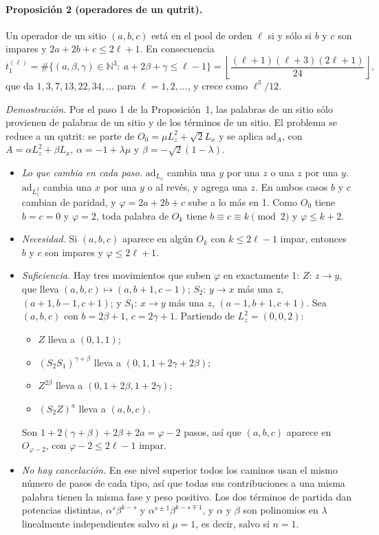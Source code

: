 \documentclass[11pt,a4paper]{article}
\begin{document}
\paragraph{Proposición 2 (operadores de un qutrit).} Un operador de un sitio $(a,b,c)$ está en el pool
de orden $\ell$ si y sólo si $b$ y $c$ son impares y $2a+2b+c\leq2\ell+1$. En consecuencia
\begin{equation}
  t^{(\ell)}_1=\#\{(a,\beta,\gamma)\in\mathbb N^3:\ a+2\beta+\gamma\leq\ell-1\}
  =\left\lfloor\frac{(\ell+1)(\ell+3)(2\ell+1)}{24}\right\rfloor ,
  \label{eq:t1}
\end{equation}
que da $1,3,7,13,22,34,\dots$ para $\ell=1,2,\dots$, y crece como $\ell^3/12$.

\emph{Demostración.} Por el paso 1 de la Proposición~1, las palabras de un sitio sólo provienen de
palabras de un sitio y de los términos de un sitio. El problema se reduce a un qutrit: se parte de
$O_0=\mu L_z^2+\sqrt2L_x$ y se aplica $\mathrm{ad}_A$, con $A=\alpha L_z^2+\beta L_x$,
$\alpha=-1+\lambda\mu$ y $\beta=-\sqrt2(1-\lambda)$.
\begin{itemize}
\item \emph{Lo que cambia en cada paso.} $\mathrm{ad}_{L_x}$ cambia una $y$ por una $z$ o una $z$ por una
  $y$. $\mathrm{ad}_{L_z^2}$ cambia una $x$ por una $y$ o al revés, y agrega una $z$. En ambos casos $b$
  y $c$ cambian de paridad, y $\varphi=2a+2b+c$ sube a lo más en 1. Como $O_0$ tiene $b=c=0$ y
  $\varphi=2$, toda palabra de $O_k$ tiene $b\equiv c\equiv k\pmod2$ y $\varphi\leq k+2$.
\item \emph{Necesidad.} Si $(a,b,c)$ aparece en algún $O_k$ con $k\leq2\ell-1$ impar, entonces $b$ y $c$
  son impares y $\varphi\leq2\ell+1$.
\item \emph{Suficiencia.} Hay tres movimientos que suben $\varphi$ en exactamente 1:
  $Z$: $z\to y$, que lleva $(a,b,c)\mapsto(a,b+1,c-1)$; $S_2$: $y\to x$ más una $z$,
  $(a+1,b-1,c+1)$; y $S_1$: $x\to y$ más una $z$, $(a-1,b+1,c+1)$. Sea $(a,b,c)$ con $b=2\beta+1$,
  $c=2\gamma+1$. Partiendo de $L_z^2=(0,0,2)$:
  \begin{itemize}
  \item $Z$ lleva a $(0,1,1)$;
  \item $(S_2S_1)^{\gamma+\beta}$ lleva a $(0,1,1+2\gamma+2\beta)$;
  \item $Z^{2\beta}$ lleva a $(0,1+2\beta,1+2\gamma)$;
  \item $(S_2Z)^{a}$ lleva a $(a,b,c)$.
  \end{itemize}
  Son $1+2(\gamma+\beta)+2\beta+2a=\varphi-2$ pasos, así que $(a,b,c)$ aparece en $O_{\varphi-2}$, con
  $\varphi-2\leq2\ell-1$ impar.
\item \emph{No hay cancelación.} En ese nivel superior todos los caminos usan el mismo número de
  pasos de cada tipo, así que todas sus contribuciones a una misma palabra tienen la misma fase y
  peso positivo. Los dos términos de partida dan potencias distintas, $\alpha^s\beta^{k-s}$ y
  $\alpha^{s\pm1}\beta^{k-s\mp1}$, y $\alpha$ y $\beta$ son polinomios en $\lambda$ linealmente
  independientes salvo si $\mu=1$, es decir, salvo si $n=1$.
\end{itemize}
\end{document}
